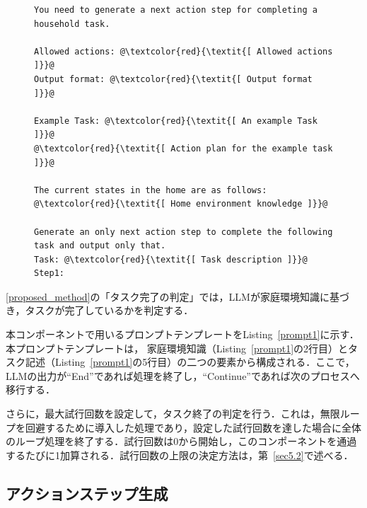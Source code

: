 \begin{figure}[tb]
    \begin{lstlisting}[caption=「アクションステップ生成」で用いるプロンプトテンプレート, label=prompt2]
You need to generate a next action step for completing a household task.

Allowed actions: @\textcolor{red}{\textit{[ Allowed actions ]}}@
Output format: @\textcolor{red}{\textit{[ Output format ]}}@

Example Task: @\textcolor{red}{\textit{[ An example Task ]}}@
@\textcolor{red}{\textit{[ Action plan for the example task ]}}@

The current states in the home are as follows: 
@\textcolor{red}{\textit{[ Home environment knowledge ]}}@

Generate an only next action step to complete the following task and output only that.
Task: @\textcolor{red}{\textit{[ Task description ]}}@
Step1:
    \end{lstlisting}
\end{figure}

\ref{proposed_method}の「タスク完了の判定」では，LLMが家庭環境知識に基づき，タスクが完了しているかを判定する．

本コンポーネントで用いるプロンプトテンプレートをListing~\ref{prompt1}に示す．本プロンプトテンプレートは，
家庭環境知識（Listing~\ref{prompt1}の2行目）とタスク記述（Listing~\ref{prompt1}の5行目）の二つの要素から構成される．ここで，LLMの出力が``End''であれば処理を終了し，``Continue''であれば次のプロセスへ移行する．

さらに，最大試行回数を設定して，タスク終了の判定を行う．これは，無限ループを回避するために導入した処理であり，設定した試行回数を達した場合に全体のループ処理を終了する．試行回数は0から開始し，このコンポーネントを通過するたびに1加算される．試行回数の上限の決定方法は，第~\ref{sec5.2}で述べる．



\subsection{アクションステップ生成} \label{sec4.3}

